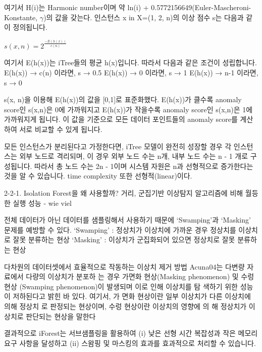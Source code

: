                     여기서 H(i)는 Harmonic number이며 약 ln(i) + 0.5772156649(Euler-Mascheroni-Konstante, $\gamma$)의 값을 갖는다. 인스턴스 x in X=(1, 2, n)의 이상 점수 s는 다음과 같이 정의됩니다.

                        $s(x,n) = 2^\frac{-E(h(x))}{c(n)}$

                    여기서 E(h(x))는 iTree들의 평균 h(x)입니다. 따라서 다음과 같은 조건이 성립합니다.
                        E(h(x)) → c(n) 이라면, s → 0.5
                        E(h(x)) → 0 이라면, s → 1
                        E(h(x)) → n-1 이라면, s → 0

                    s(x, n)을 이용해 E(h(x))의 값을 [0,1]로 표준화했다. E(h(x))가 클수록 anomaly score인 s(x,n)은 0에 가까워지고 E(h(x))가 작을수록 anomaly score인 s(x,n)은 1에 가까워지게 됩니다. 이 값을 기준으로 모든 데이터 포인트들의 anomaly score를 계산하여 서로 비교할 수 있게 됩니다.


                    


                모든 인스턴스가 분리된다고 가정한다면, iTree 모델이 완전히 성장할 경우 각 인스턴스는 외부 노드로 격리되며, 이 경우 외부 노드 수는 n개, 내부 노드 수는 n - 1 개로 구성됩니다. 따라서 총 노드 수는 2n - 1이며 시스템 자원은 n과 선형적으로 증가한다는 것을 알 수 있습니다. time complexity 또한 선형적(linear)이다.

                2-2-1. Isolation Forest을 왜 사용할까?
                거리, 군집기반 이상탐지 알고리즘에 비해 월등한 실행 성능 - wie viel
                
                전체 데이터가 아닌 데이터를 샘플링해서 사용하기 때문에 ‘Swamping’과 ‘Masking’ 문제를 예방할 수 있다.
                    ‘Swamping’ : 정상치가 이상치에 가까운 경우 정상치를 이상치로 잘못 분류하는 현상
                    ‘Masking’ : 이상치가 군집화되어 있으면 정상치로 잘못 분류하는 현상

                다차원의 데이터셋에서 효율적으로 작동하는 이상치 제거 방법
                Acuna04는 다변량 자료에서 다량의 이상치가 분포하
                는 경우 가면화 현상(Masking phenomenon) 및 수렁 현상
                (Swamping phenomenon)이 발생되며 이로 인해 이상치를 탐
                색하기 위한 성능이 저하된다고 밝힌 바 있다. 여기서, 가
                면화 현상이란 일부 이상치가 다른 이상치에 의해 정상치
                로 판정되는 현상이며, 수렁 현상이란 이상치의 영향에 의
                해 정상치가 이상치로 판단되는 현상을 말한다
            

                결과적으로 iForest는 서브샘플링을 활용하여 (i) 낮은 선형 시간 복잡성과 작은 메모리 요구 사항을 달성하고 (ii) 스왐핑 및 마스킹의 효과를 효과적으로 처리할 수 있습니다.